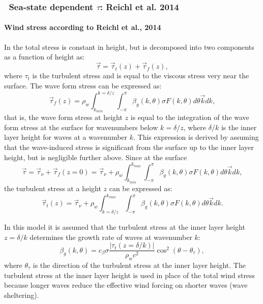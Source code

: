 \vsssub
\subsubsection{~Sea-state dependent $\tau$: Reichl et al. 2014} \label{sec:FLD1}
\vsssub


\paragraph{Wind stress according to Reichl et al., 2014}

In \citet{art:Rei14} the total stress is constant in height, but is decomposed into two components as a function of height as:
\begin{equation}
\vec{\tau}=\vec{\tau}_t(z)+\vec{\tau}_f(z),
\end{equation}
where $\tau_t$ is the turbulent stress and is equal to the viscous stress very near the surface.
The wave form stress can be expressed as:
\begin{equation}
\vec{\tau}_f(z)=\rho_w\int^{k=\delta/z}_{k_{min}} \int^\pi_{-\pi}\beta_g(k,\theta) \sigma F(k,\theta) d\theta {\vec{k}} dk,
\end{equation}
that is, the wave form stress at height $z$ is equal to the integration of the wave form stress at the surface for wavenumbers below $k=\delta/z$, where $\delta/k$ is the inner layer height \citep{art:Har04} for waves at a wavenumber $k$.
This expression is derived by assuming that the wave-induced stress is significant from the surface up to the inner layer height, but is negligible further above.
Since at the surface
\begin{equation}
\vec{\tau}=\vec{\tau}_\nu+\vec{\tau}_f(z=0)=\vec{\tau}_\nu+\rho_w\int^{k_{max}}_{k_{min}} \int^\pi_{-\pi}\beta_g(k,\theta) \sigma F(k,\theta) d\theta {\vec{k}} dk,
\end{equation}
the turbulent stress at a height $z$ can be expressed as:
\begin{equation}
\vec{\tau}_t(z)=\vec{\tau}_\nu+\rho_w\int^{k_{max}}_{k=\delta/z} \int^\pi_{-\pi}\beta_g(k,\theta) \sigma F(k,\theta) d\theta {\vec{k}} dk.
\end{equation}

In this model it is assumed that the turbulent stress at the inner layer height $z=\delta/k$ determines the growth rate of waves at wavenumber $k$:
\begin{equation}
\beta_g(k,\theta)=c_\beta \sigma\frac{\left|\tau_t(z=\delta/k)\right|}{\rho_wc^2}\cos^2(\theta-\theta_\tau),
\end{equation}
where $\theta_\tau$ is the direction of the turbulent stress at the inner layer height.
The turbulent stress at the inner layer height is used in place of the total wind stress because longer waves reduce the effective wind forcing on shorter waves (wave sheltering).

